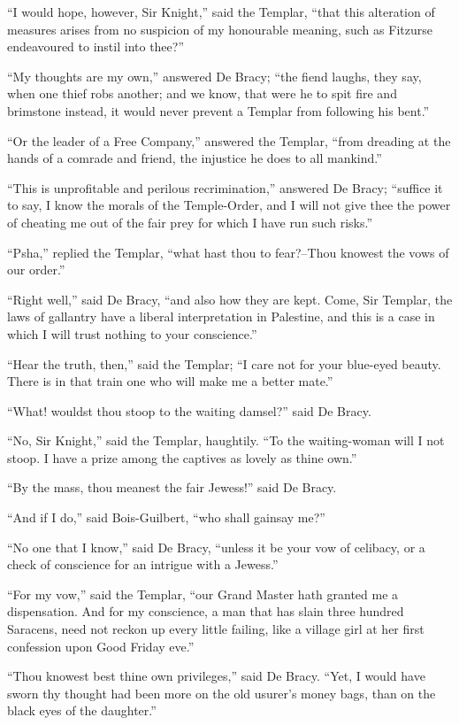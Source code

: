 ``I would hope, however, Sir Knight,'' said the Templar, ``that this
alteration of measures arises from no suspicion of my honourable
meaning, such as Fitzurse endeavoured to instil into thee?''

``My thoughts are my own,'' answered De Bracy; ``the fiend laughs, they
say, when one thief robs another; and we know, that were he to spit fire
and brimstone instead, it would never prevent a Templar from following
his bent.''

``Or the leader of a Free Company,'' answered the Templar, ``from
dreading at the hands of a comrade and friend, the injustice he does to
all mankind.''

``This is unprofitable and perilous recrimination,'' answered De Bracy;
``suffice it to say, I know the morals of the Temple-Order, and I will
not give thee the power of cheating me out of the fair prey for which I
have run such risks.''

``Psha,'' replied the Templar, ``what hast thou to fear?--Thou knowest
the vows of our order.''

``Right well,'' said De Bracy, ``and also how they are kept. Come, Sir
Templar, the laws of gallantry have a liberal interpretation in
Palestine, and this is a case in which I will trust nothing to your
conscience.''

``Hear the truth, then,'' said the Templar; ``I care not for your
blue-eyed beauty. There is in that train one who will make me a better
mate.''

``What! wouldst thou stoop to the waiting damsel?'' said De Bracy.

``No, Sir Knight,'' said the Templar, haughtily. ``To the waiting-woman
will I not stoop. I have a prize among the captives as lovely as thine
own.''

``By the mass, thou meanest the fair Jewess!'' said De Bracy.

``And if I do,'' said Bois-Guilbert, ``who shall gainsay me?''

``No one that I know,'' said De Bracy, ``unless it be your vow of
celibacy, or a check of conscience for an intrigue with a Jewess.''

``For my vow,'' said the Templar, ``our Grand Master hath granted me a
dispensation. And for my conscience, a man that has slain three hundred
Saracens, need not reckon up every little failing, like a village girl
at her first confession upon Good Friday eve.''

``Thou knowest best thine own privileges,'' said De Bracy. ``Yet, I
would have sworn thy thought had been more on the old usurer's money
bags, than on the black eyes of the daughter.''

